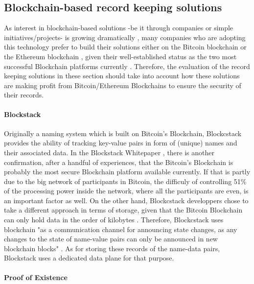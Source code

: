 \subsection{Blockchain-based record keeping solutions}
As interest in blockchain-based solutions -be it through companies or simple initiatives/projects- is growing dramatically \cite{trends}, many companies who are adopting this technology prefer to build their solutions either on the Bitcoin blockchain or the Ethereum blockchain \cite{canada}, given their well-established status as the two most successful Blockchain platforms currently \cite{value}. Therefore, the evaluation of the record keeping solutions in these section should take into account how these solutions are making profit from Bitcoin/Ethereum Blockchains to ensure the security of their records.\\
\\
\textbf{\large{Blockstack}}\\
\\
Originally a naming system which is built on Bitcoin's Blockchain, Blockcstack provides the ability of tracking key-value pairs in form of (unique) names and their associated data. In the Blockstack Whitepaper \cite{bswp}, there is another confirmation, after a handful of experiences, that the Bitcoin's Blockchain is probably the most secure Blockchain platform available currently. If that is partly due to the big network of participants in Bitcoin, the difficuly of controlling 51\% of the processing power inside the network,
where all the participants are even, is an important factor as well. On the other hand, Blockcstack developpers chose to take a different approach in terms of storage, given that the Bitcoin Blockchain can only hold data in the order of kilobytes \cite{satoshi}. Therefore, Blockcstack uses blockchain "as a communication channel for announcing state changes, as any changes to the state of name-value pairs can only be announced in new blockchain blocks" \cite{bswp}. As for storing these records of the name-data pairs, Blockstack uses a dedicated data plane for that purpose.\\
\\
\textbf{\large{Proof of Existence \cite{poe}}}\\
\\ 
